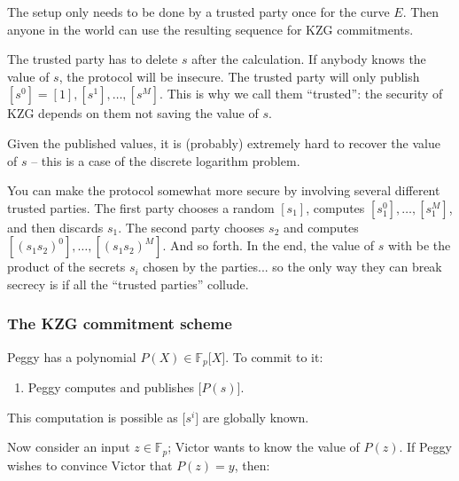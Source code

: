 The setup only needs to be done by a trusted party once for the curve
\(E\). Then anyone in the world can use the resulting sequence for KZG
commitments.

\begin{remark}
The trusted party has to delete $s$ after the calculation.
If anybody knows the value of $s$, the protocol will be insecure.
The trusted party will only publish $[s^0] = [1], [s^1], \ldots, [s^M]$.
This is why we call them ``trusted'': the security of KZG
depends on them not saving the value of $s$.

Given the published values, it is (probably) extremely hard to recover the value of $s$ --
this is a case of the discrete logarithm problem.

You can make the protocol somewhat more secure by involving
several different trusted parties.
The first party chooses a random $[s_1]$,
computes $[s_1^0], \ldots, [s_1^M]$, 
and then discards $s_1$.
The second party chooses $s_2$ and computes $[(s_1 s_2)^0], \ldots, [(s_1 s_2)^M]$.
And so forth.
In the end, the value of $s$ with be the product of the secrets 
$s_i$ chosen by the parties... so the only way they can break secrecy
is if all the ``trusted parties'' collude.
\end{remark}

\subsubsection{The KZG commitment scheme}

Peggy has a polynomial \(P(X) \in \mathbb{F}_{p}\lbrack X\rbrack\). To
commit to it:

\begin{algo}
\leavevmode
\begin{enumerate}
\item
  Peggy computes and publishes \(\lbrack P(s) \rbrack\).
\end{enumerate}
\end{algo}

This computation is possible as \(\lbrack s^{i} \rbrack\) are
globally known.  

Now consider an input \(z \in \mathbb{F}_{p}\); Victor wants to know the
value of \(P(z)\). If Peggy wishes to convince Victor that \(P(z) = y\),
then:

